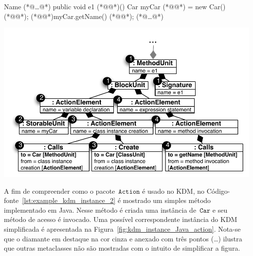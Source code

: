 
\noindent\begin{minipage}{.43\textwidth}
	\begin{codigo}[caption={[Pedaço de código Java para ilustrar como o pacote~$\mathtt{Action}$ funciona.] Método \texttt{e1} ilustrando como o Pacote \texttt{Action} funciona.}, escapeinside={(*@}{@*)}, basicstyle=\footnotesize, label={lst:example_kdm_instance_2}]{Name}
	(*@\ldots @*)
	public void e1 (*@@*)(){
	Car myCar (*@@*) = new Car() (*@@*);
	(*@@*)myCar.getName() (*@@*);
	}
	(*@\ldots @*)
	\end{codigo}
\end{minipage}\hfill
\begin{minipage}{.65\textwidth}
	\centering
	\includegraphics[scale=0.6]{images/actionInstanceKDM_2}
	\fautor
	\label{fig:kdm_instance_Java_action}
\end{minipage}

A fim de compreender como o pacote~$\mathtt{Action}$ é usado no KDM, no Código-fonte~\ref{lst:example_kdm_instance_2} é mostrado um simples método implementado em Java. Nesse método é criada uma instância de~$\mathtt{Car}$ e seu método de acesso é invocado. Uma possível correspondente instância do KDM simplificada é apresentada na Figura~\ref{fig:kdm_instance_Java_action}. Nota-se que o diamante em destaque na cor cinza e anexado com três pontos (\ldots) ilustra que outras metaclasses não são mostradas com o intuito de simplificar a figura.

